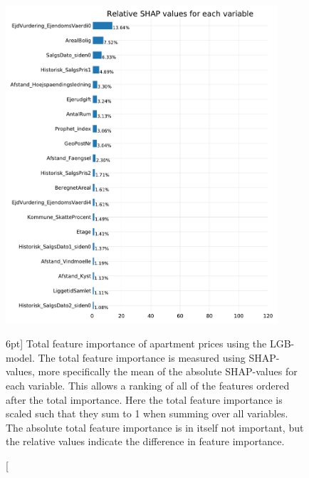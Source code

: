 \documentclass[a4paper, twoside]{tufte-book}
\begin{document}
\begin{figure}
  \includegraphics[width=0.9\textwidth, trim=0 0 0 40, clip]{figures/housing/Ejerlejlighed_v17_cut_all_Ncols_all_lgb_tight_SHAP_vals_summary_all.pdf}
  \caption[Total feature importance of apartment prices using LGB][6pt]
          {Total feature importance of apartment prices using the LGB-model. The total feature importance is measured using SHAP-values, more specifically the mean of the absolute SHAP-values for each variable. This allows a ranking of all of the features ordered after the total importance. Here the total feature importance is scaled such that they sum to 1 when summing over all variables. The absolute total feature importance is in itself not important, but the relative values indicate the difference in feature importance. 
          } 
  \label{fig:h:shap_overview_total}
\end{figure}
\end{document}

